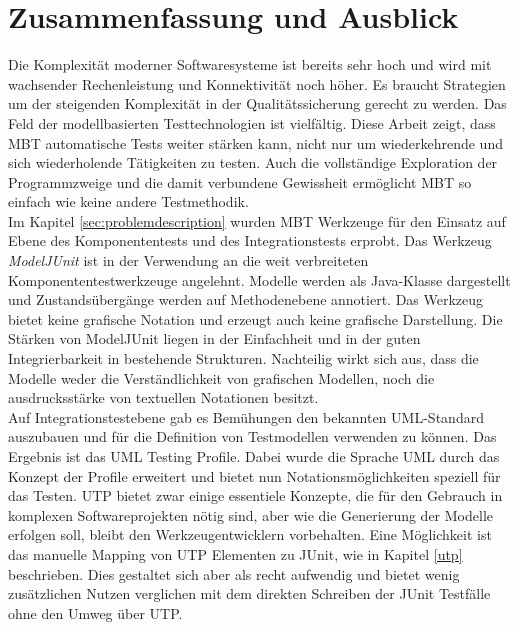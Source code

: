 \chapter{Zusammenfassung und Ausblick}
Die Komplexität moderner Softwaresysteme ist bereits sehr hoch und wird mit wachsender Rechenleistung und Konnektivität noch höher. Es braucht Strategien um der steigenden Komplexität in der Qualitätssicherung gerecht zu werden. Das Feld der modellbasierten Testtechnologien ist vielfältig. Diese Arbeit zeigt, dass \Gls{MBT} automatische Tests weiter stärken kann, nicht nur um wiederkehrende und sich wiederholende Tätigkeiten zu testen. Auch die vollständige Exploration der Programmzweige und die damit verbundene Gewissheit ermöglicht \Gls{MBT} so einfach wie keine andere Testmethodik.\\
Im Kapitel \ref{sec:problemdescription}  wurden \Gls{MBT} Werkzeuge für den Einsatz auf Ebene des Komponententests und des Integrationstests erprobt. Das Werkzeug \textit{ModelJUnit} ist in der Verwendung an die weit verbreiteten Komponententestwerkzeuge angelehnt. Modelle werden als Java-Klasse dargestellt und Zustandsübergänge werden auf Methodenebene annotiert. Das Werkzeug bietet keine grafische Notation und erzeugt auch keine grafische Darstellung. Die Stärken von ModelJUnit liegen in der Einfachheit und in der guten Integrierbarkeit in bestehende Strukturen. Nachteilig wirkt sich aus, dass die Modelle weder die Verständlichkeit von grafischen Modellen, noch die ausdrucksstärke von textuellen Notationen besitzt.\\
Auf Integrationstestebene gab es Bemühungen den bekannten UML-Standard auszubauen und für die Definition von Testmodellen verwenden zu können. Das Ergebnis ist das UML Testing Profile. Dabei wurde die Sprache UML durch das Konzept der Profile erweitert und bietet nun Notationsmöglichkeiten speziell für das Testen. UTP bietet zwar einige essentiele Konzepte, die für den Gebrauch in komplexen Softwareprojekten nötig sind, aber wie die Generierung der Modelle erfolgen soll, bleibt den Werkzeugentwicklern vorbehalten. Eine Möglichkeit ist das manuelle Mapping von UTP Elementen zu JUnit, wie in Kapitel \ref{utp} beschrieben. Dies gestaltet sich aber als recht aufwendig und bietet wenig zusätzlichen Nutzen verglichen mit dem direkten Schreiben der JUnit Testfälle ohne den Umweg über UTP.\\
